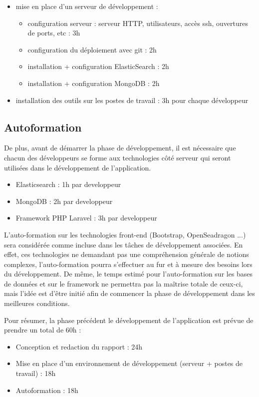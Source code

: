         \begin{itemize}
            \item mise en place d'un serveur de développement :
            \begin{itemize}
                \item configuration serveur : serveur HTTP, utilisateurs, accès ssh, ouvertures de ports, etc : 3h
                \item configuration du déploiement avec git : 2h
                \item installation + configuration ElasticSearch : 2h
                \item installation + configuration MongoDB : 2h
            \end{itemize}
            \item installation des outils sur les postes de travail : 3h pour chaque développeur
        \end{itemize}

    \subsection{Autoformation}
        De plus, avant de démarrer la phase de développement, il est nécessaire que chacun des développeurs se forme aux technologies côté serveur qui seront utilisées dans le développement de l'application.
        
        \begin{itemize}
            \item Elasticsearch : 1h par developpeur
            \item MongoDB : 2h par developpeur
            \item Framework PHP Laravel : 3h par developpeur
        \end{itemize}

        L'auto-formation sur les technologies front-end (Bootstrap, OpenSeadragon ...) sera considérée comme incluse dans les tâches de développement associées. En effet, ces technologies ne demandant pas une compréhension générale de notions complexes, l'auto-formation pourra s'effectuer au fur et à mesure des besoins lors du développement. De même, le temps estimé pour l'auto-formation sur les bases de données et sur le framework ne permettra pas la maîtrise totale de ceux-ci, mais l'idée est d'être initié afin de commencer la phase de développement dans les meilleures conditions.

        Pour résumer, la phase précédent le développement de l'application est prévue de prendre un total de 60h :
        \begin{itemize}
            \item Conception et redaction du rapport : 24h
            \item Mise en place d'un environnement de développement (serveur + postes de travail) : 18h
            \item Autoformation : 18h
        \end{itemize}